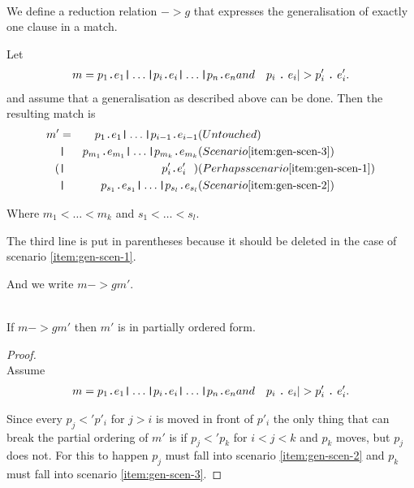 \begin{definition}[Generalisation, $->g$]\ \\
\label{def:gener-match}
  We define a reduction relation $->g$ that expresses the
  generalisation of exactly one clause in a match.

  Let
  \begin{eqnarray*}[rqTcql]
    m = p_1 \texttt{.} e_1 \texttt{|} \ldots \texttt{|} p_i \texttt{.} e_i
    \texttt{|} \ldots \texttt{|} p_n \texttt{.} e_n & and & \clause{p_i}{e_i} |> \clause{p'_i}{e'_i}.
  \end{eqnarray*}
  and assume that a generalisation as described above can be done. Then the
  resulting match is
  \begin{eqnarray*}[rclqqqTl]
    m' &=& p_1 \texttt{.} e_1 \texttt{|} \ldots \texttt{|} p_{i-1} \texttt{.}
    e_{i-1} & (Untouched)\label{eq:gen-1}\\
    &\texttt{|}& p_{m_1} \texttt{.} e_{m_1} \texttt{|} \ldots \texttt{|} p_{m_k}
    \texttt{.} e_{m_k} & (Scenario \ref{item:gen-scen-3})\label{eq:gen-2}\\
    (&\texttt{|}& p'_i \texttt{.} e'_i \ \ ) 
    & (Perhaps scenario \ref{item:gen-scen-1})\label{eq:gen-3}\\
    &\texttt{|}& p_{s_1} \texttt{.} e_{s_1} \texttt{|} \ldots \texttt{|} p_{s_l}
    \texttt{.} e_{s_l} & (Scenario \ref{item:gen-scen-2})\label{eq:gen-4}
  \end{eqnarray*}

  Where $m_1 < \ldots < m_k$ and $s_1 < \ldots < s_l$.

  The third line is put in parentheses because it should be deleted in the case
  of scenario \ref{item:gen-scen-1}.

  And we write $m ->g m'$.

  \begin{lemma}\ \\
    If $m ->g m'$ then $m'$ is in partially ordered form.
  \end{lemma}
  \begin{proof}\ \\
    Assume
    \begin{eqnarray*}[rqTcql]
      m = p_1 \texttt{.} e_1 \texttt{|} \ldots \texttt{|} p_i \texttt{.} e_i
      \texttt{|} \ldots \texttt{|} p_n \texttt{.} e_n & and & \clause{p_i}{e_i} |> \clause{p'_i}{e'_i}.
    \end{eqnarray*}

    Since every $p_j <' p'_i$ for $j > i$ is moved in front of $p'_i$ the only
    thing that can break the partial ordering of $m'$ is if $p_j <' p_k$ for
    $i < j < k$ and $p_k$ moves, but $p_j$ does not. For this to happen $p_j$
    must fall into scenario \ref{item:gen-scen-2} and $p_k$ must fall into
    scenario \ref{item:gen-scen-3}.


\end{proof}
\end{definition}
